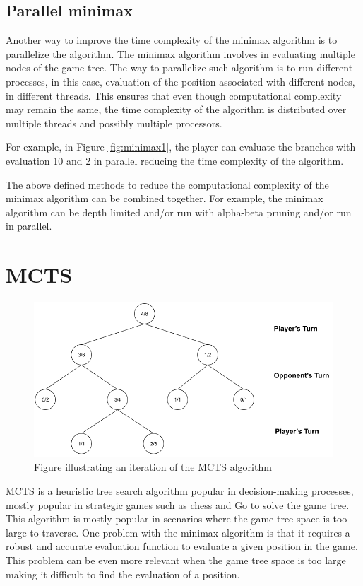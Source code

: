 \subsection{Parallel minimax}
Another way to improve the time complexity of the minimax algorithm is to parallelize the algorithm. The minimax algorithm involves in evaluating multiple nodes of the game tree. The way to parallelize such algorithm is to run different processes, in this case, evaluation of the position associated with different nodes, in different threads. This ensures that even though computational complexity may remain the same, the time complexity of the algorithm is distributed over multiple threads and possibly multiple processors.

For example, in Figure \ref{fig:minimax1}, the player can evaluate the branches with evaluation 10 and 2 in parallel reducing the time complexity of the algorithm.


The above defined methods to reduce the computational complexity of the minimax algorithm can be combined together. For example, the minimax algorithm can be depth limited and/or run with alpha-beta pruning and/or run in parallel.

\section{\ac{MCTS}}

\begin{figure}[!ht]
    \centering
    \includegraphics[width = \linewidth]{../img/MCTS1.png}
    \caption{Figure illustrating an iteration of the MCTS algorithm}
    \label{fig:MCTS1}
\end{figure}

\ac{MCTS} \cite{Coulom2006Efficient} is a heuristic tree search algorithm popular in decision-making processes, mostly popular in strategic games such as chess and Go to solve the game tree. This algorithm is mostly popular in scenarios where the game tree space is too large to traverse. One problem with the minimax algorithm is that it requires a robust and accurate evaluation function to evaluate a given position in the game. This problem can be even more relevant when the game tree space is too large making it difficult to find the evaluation of a position.

